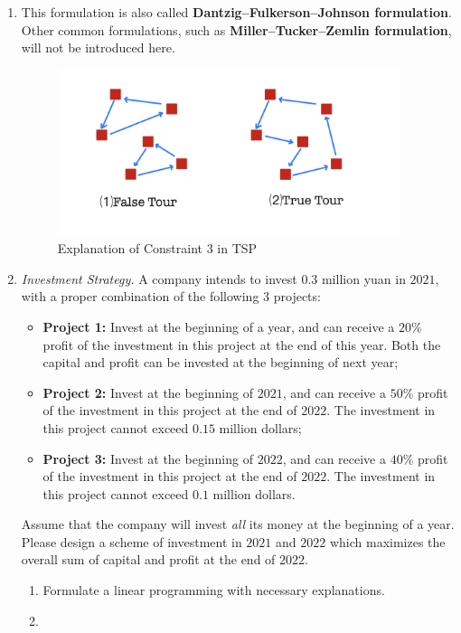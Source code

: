 \documentclass[12pt,a4paper]{article}
\makeatletter
\newtheorem*{solution}{Solution}
\theoremstyle{definition}
\renewenvironment{solution}[1][Solution] {\par\pushQED{\qed}\normalfont\topsep6\p@\@plus6\p@\relax\trivlist\item[\hskip\labelsep\bfseries#1\@addpunct{.}]\ignorespaces}{\popQED\endtrivlist\@endpefalse} \makeatother
\makeatother
\begin{document}
\begin{enumerate}
\begin{solution}
\begin{itemize}
    \end{itemize}
    This formulation is also called \textbf{Dantzig–Fulkerson–Johnson formulation}. Other common formulations, such as \textbf{Miller–Tucker–Zemlin formulation}, will not be introduced here.
    \begin{figure}[htbp]
        \centering
        \includegraphics[width=10cm]{tour.jpg}
        \caption{Explanation of Constraint 3 in TSP}
        \label{tour}
    \end{figure}
    \end{solution}
    \item
    \textit{Investment Strategy.} A company intends to invest $0.3$ million yuan in $2021$, with a proper combination of the following $3$ projects:
    \begin{itemize}
    \item \textbf{Project 1:} Invest at the beginning of a year, and can receive a $20\%$ profit of the investment in this project at the end of this year. Both the capital and profit can be invested at the beginning of next year;
    \item \textbf{Project 2:} Invest at the beginning of $2021$, and can receive a $50\%$ profit of the investment in this project at the end of $2022$. The investment in this project cannot exceed $0.15$ million dollars;
    \item \textbf{Project 3:} Invest at the beginning of $2022$, and can receive a $40\%$ profit of the investment in this project at the end of $2022$. The investment in this project cannot exceed $0.1$ million dollars.
    \end{itemize}
    Assume that the company will invest \emph{all} its money at the beginning of a year. Please design a scheme of investment in $2021$ and $2022$ which maximizes the overall sum of capital and profit at the end of $2022$.
    \begin{enumerate}
    \item
    Formulate a linear programming with necessary explanations.
    \begin{solution}

\end{solution}
\end{enumerate}
\end{enumerate}
\end{document}
